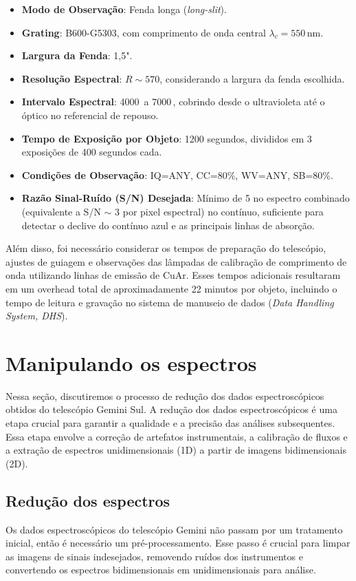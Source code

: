 \begin{itemize}
    \item \textbf{Modo de Observação}: Fenda longa (\textit{long-slit}).
    \item \textbf{Grating}: B600-G5303, com comprimento de onda central $\lambda_c = 550 \, \text{nm}$.
    \item \textbf{Largura da Fenda}: 1,5".
    \item \textbf{Resolução Espectral}: $R \sim 570$, considerando a largura da fenda escolhida.
    \item \textbf{Intervalo Espectral}: 4000\, a 7000\,, cobrindo desde o ultravioleta até o óptico no referencial de repouso.
    \item \textbf{Tempo de Exposição por Objeto}: 1200 segundos, divididos em 3 exposições de 400 segundos cada.
    \item \textbf{Condições de Observação}: IQ=ANY, CC=80\%, WV=ANY, SB=80\%.
    \item \textbf{Razão Sinal-Ruído (S/N) Desejada}: Mínimo de 5 no espectro combinado (equivalente a S/N $\sim$ 3 por pixel espectral) no contínuo, suficiente para detectar o declive do contínuo azul e as principais linhas de absorção.
\end{itemize}

Além disso, foi necessário considerar os tempos de preparação do telescópio, ajustes de guiagem e observações das lâmpadas de calibração de comprimento de onda utilizando linhas de emissão de CuAr. Esses tempos adicionais resultaram em um overhead total de aproximadamente 22 minutos por objeto, incluindo o tempo de leitura e gravação no sistema de manuseio de dados (\textit{Data Handling System, DHS}).

\section{Manipulando os espectros}\label{sec:manipulando_espectros}
Nessa seção, discutiremos o processo de redução dos dados espectroscópicos obtidos do telescópio Gemini Sul. A redução dos dados espectroscópicos é uma etapa crucial para garantir a qualidade e a precisão das análises subsequentes. Essa etapa envolve a correção de artefatos instrumentais, a calibração de fluxos e a extração de espectros unidimensionais (1D) a partir de imagens bidimensionais (2D).

\subsection{Redução dos espectros}\label{subsection:reduzindo_espectros}
Os dados espectroscópicos do telescópio Gemini não passam por um tratamento inicial, então é necessário um pré-processamento. Esse passo é crucial para limpar as imagens de sinais indesejados, removendo ruídos dos instrumentos e convertendo os espectros bidimensionais em unidimensionais para análise.

